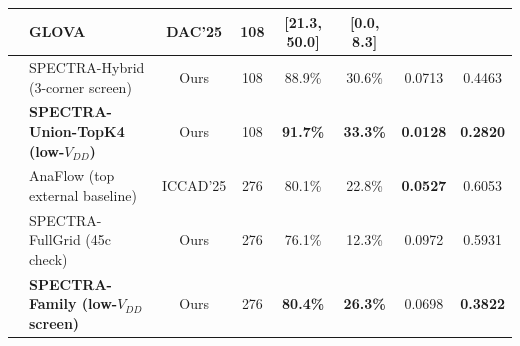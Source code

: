 \begin{table}[t]
\begin{adjustbox}{max width=\textwidth}
\begin{tabular}{@{}llcccccc@{}}
 & GLOVA~\cite{kim2025glova} & DAC'25 & 108 & \SizGLOVATTPct{} [21.3, 50.0] & \SizGLOVAPVTPct{} [0.0, 8.3] & \SizGLOVATTViol{} & \textbf{\SizGLOVAPVTViol{}} \\
\midrule
{}
 & SPECTRA-Hybrid (3-corner screen) & Ours & 108 & 88.9\% & 30.6\% & 0.0713 & 0.4463 \\
 & \textbf{SPECTRA-Union-TopK4 (low-$V_{DD}$)} & Ours & 108 & \textbf{91.7\%} & \textbf{33.3\%} & \textbf{0.0128} & \textbf{0.2820} \\
\midrule
{}
 & AnaFlow (top external baseline)~\cite{ahmadzadeh2025anaflow} & ICCAD'25 & 276 & 80.1\% & 22.8\% & \textbf{0.0527} & 0.6053 \\
 & SPECTRA-FullGrid (45c check) & Ours & 276 & 76.1\% & 12.3\% & 0.0972 & 0.5931 \\
 & \textbf{SPECTRA-Family (low-$V_{DD}$ screen)} & Ours & 276 & \textbf{80.4\%} & \textbf{26.3\%} & 0.0698 & \textbf{0.3822} \\
\bottomrule
\end{tabular}
\end{adjustbox}
\end{table}
